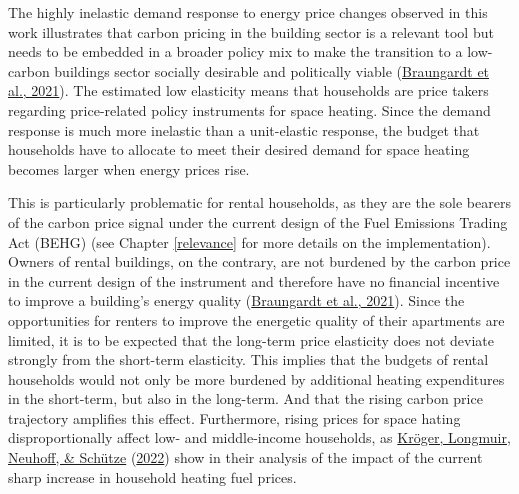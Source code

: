 \documentclass[12pt,twoside]{reedthesis}
\begin{document}
The highly inelastic demand response to energy price changes observed in this work illustrates that carbon pricing in the building sector is a relevant tool but needs to be embedded in a broader policy mix to make the transition to a low-carbon buildings sector socially desirable and politically viable (\protect\hyperlink{ref-braungardt_etal21}{Braungardt et al., 2021}). The estimated low elasticity means that households are price takers regarding price-related policy instruments for space heating. Since the demand response is much more inelastic than a unit-elastic response, the budget that households have to allocate to meet their desired demand for space heating becomes larger when energy prices rise.

This is particularly problematic for rental households, as they are the sole bearers of the carbon price signal under the current design of the Fuel Emissions Trading Act (BEHG) (see Chapter \ref{relevance} for more details on the implementation). Owners of rental buildings, on the contrary, are not burdened by the carbon price in the current design of the instrument and therefore have no financial incentive to improve a building's energy quality (\protect\hyperlink{ref-braungardt_etal21}{Braungardt et al., 2021}). Since the opportunities for renters to improve the energetic quality of their apartments are limited, it is to be expected that the long-term price elasticity does not deviate strongly from the short-term elasticity. This implies that the budgets of rental households would not only be more burdened by additional heating expenditures in the short-term, but also in the long-term. And that the rising carbon price trajectory amplifies this effect. Furthermore, rising prices for space hating disproportionally affect low- and middle-income households, as \protect\hyperlink{ref-kroger_etal22}{Kröger, Longmuir, Neuhoff, \& Schütze} (\protect\hyperlink{ref-kroger_etal22}{2022}) show in their analysis of the impact of the current sharp increase in household heating fuel prices.
\end{document}
